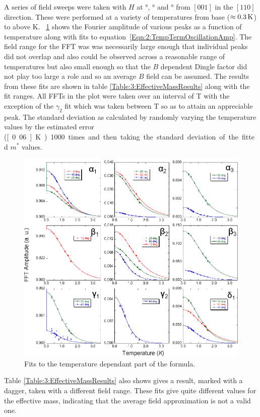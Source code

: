 A series of field sweeps were taken with $H$ at \unit[12]{\degree}, \unit[28]{\degree} and \unit[46]{\degree} from $[001]$ in the $[110]$ direction. These were performed at a variety of temperatures from base ($\approx\unit[0.3]{K}$) to above \unit[2]{K}. \Fig~\ref{Fig:3:SimpleLKFits} shows the Fourier amplitude of various peaks as a function of temperature along with fits to equation~\ref{Eqn:2:TempTermOscillationAmp}. The field range for the FFT was was necessarily large enough that individual peaks did not overlap and also could be observed across a reasonable range of temperatures but also small enough so that the $B$ dependent Dingle factor did not play too large a role and so an average $B$ field can be assumed. The results from these fits are shown in table \ref{Table:3:EffectiveMassResults} along with the fit ranges. All FFTs in the plot were taken over an interval of \unit[12--18]{T} with the exception of the $\gamma_2$ fit which was taken between \unit[16-18]{T} so as to attain an appreciable peak. The standard deviation as calculated by randomly varying the temperature values by the estimated error (\unit[0.06]{K}) 1000 times and then taking the standard deviation of the fitted $m^*$ values.
\begin{figure}[htbp]
    \begin{center}
        \includegraphics[scale=0.9]{Chapter3-dHvABaFe2P2/Figures/Mass/SimpleLKFits/SimpleLKFits}
        \caption{Fits to the temperature dependant part of the \LK formula. }
        \label{Fig:3:SimpleLKFits}
    \end{center}
\end{figure}
Table \ref{Table:3:EffectiveMassResults} also shows gives a result, marked with a dagger, taken with a different field range. These fits give quite different values for the effective mass, indicating that the average field approximation is not a valid one.

